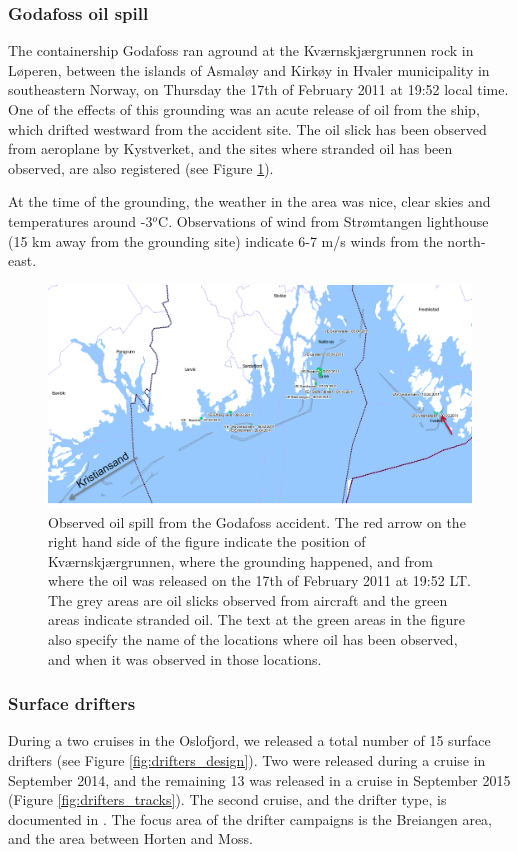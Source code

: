 \subsubsection{Godafoss oil spill}
\label{sect:godafoss_obs}
The containership Godafoss ran aground at the Kv{\ae}rnskj{\ae}rgrunnen rock in L{\o}peren, between the islands of Asmal{\o}y and Kirk{\o}y in Hvaler municipality in southeastern Norway, on Thursday the 17th of February 2011 at 19:52 local time. One of the effects of this grounding was an acute release of oil from the ship, which drifted westward from the accident site. The oil slick has been observed from aeroplane by Kystverket, and the sites where stranded oil has been observed, are also registered (see Figure \ref{fig:godafoss_oil}).

At the time of the grounding, the weather in the area was nice, clear skies and temperatures around -3$^o$C. Observations of wind from Str{\o}mtangen lighthouse (15 km away from the grounding site) indicate 6-7 m/s winds from the north-east.

\begin{figure}[ht]
\centerline{
\includegraphics*[width=\textwidth]{Figurer/Godafoss}
}
\caption{\small
Observed oil spill from the Godafoss accident. The red arrow on the right hand side of the figure indicate the position of Kv{\ae}rnskj{\ae}rgrunnen, where the grounding happened, and from where the oil was released on the 17th of February 2011 at 19:52 LT. The grey areas are oil slicks observed from aircraft and the green areas indicate stranded oil. The text at the green areas in the figure also specify the name of the locations where oil has been observed, and when it was observed in those locations.}
\label{fig:godafoss_oil}
\end{figure}

\subsubsection{Surface drifters}
During a two cruises in the Oslofjord, we released a total number of 15 surface drifters (see Figure \ref{fig:drifters_design}). Two were released during a cruise in September 2014, and the remaining 13 was released in a cruise in September 2015 (Figure \ref{fig:drifters_tracks}). The second cruise, and the drifter type, is documented in \cite{hjelm:etal:2016}. The focus area of the drifter campaigns is the Breiangen area, and the area between Horten and Moss.

